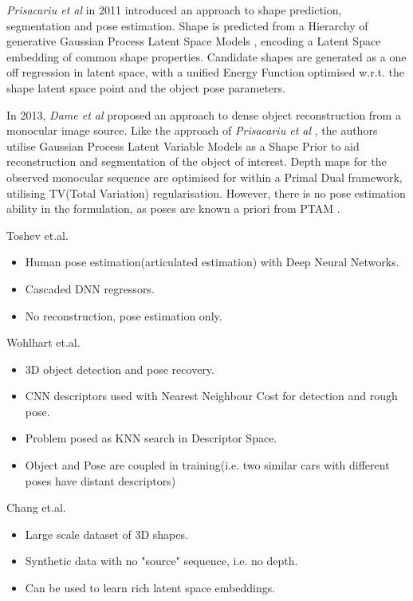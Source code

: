 \textit{Prisacariu et al} \cite{Prisacariu2011} in 2011 introduced an approach to shape prediction, 
segmentation and pose estimation. Shape is predicted from a Hierarchy of generative Gaussian Process 
Latent Space Models \cite{Lawrence2005}, encoding a Latent Space embedding of common shape properties. 
Candidate shapes are generated as a one off regression in latent space, with a unified Energy Function 
optimised w.r.t. the shape latent space point and the object pose parameters.

In 2013, \textit{Dame et al} \cite{Dame2013} proposed an approach to dense object reconstruction from a 
monocular image source. Like the approach of \textit{Prisacariu et al} \cite{Prisacariu2011}, the authors 
utilise Gaussian Process Latent Variable Models as a Shape Prior to aid reconstruction and segmentation 
of the object of interest. Depth maps for the observed monocular sequence are optimised for within a 
Primal Dual framework, utilising TV(Total Variation) regularisation. However, there is no pose estimation 
ability in the formulation, as poses are known a priori from PTAM \cite{PTAM}.

Toshev et.al. \cite{Toshev2014}
\begin{itemize}
	\item Human pose estimation(articulated estimation) with Deep Neural Networks.
	\item Cascaded DNN regressors.
	\item No reconstruction, pose estimation only.
\end{itemize}

Wohlhart et.al. \cite{Wohlhart2015}
\begin{itemize}
	\item 3D object detection and pose recovery.
	\item CNN descriptors used with Nearest Neighbour Cost for detection and rough pose.
	\item Problem posed as KNN search in Descriptor Space.
	\item Object and Pose are coupled in training(i.e. two similar cars with different poses have distant descriptors)
\end{itemize}

Chang et.al. \cite{Chang2015}
\begin{itemize}
	\item Large scale dataset of 3D shapes.
	\item Synthetic data with no "source" sequence, i.e. no depth.
	\item Can be used to learn rich latent space embeddings.
\end{itemize}

